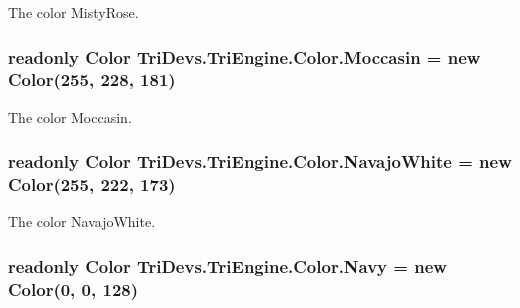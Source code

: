 The color Misty\-Rose. 

\hypertarget{struct_tri_devs_1_1_tri_engine_1_1_color_a39be3b920f7db0c555fc245e8a0dd127}{
\subsubsection[{Moccasin}]{\setlength{\rightskip}{0pt plus 5cm}readonly {\bf Color} Tri\-Devs.\-Tri\-Engine.\-Color.\-Moccasin = new {\bf Color}(255, 228, 181)\hspace{0.3cm}{\ttfamily [static]}}}\label{struct_tri_devs_1_1_tri_engine_1_1_color_a39be3b920f7db0c555fc245e8a0dd127}


The color Moccasin. 

\hypertarget{struct_tri_devs_1_1_tri_engine_1_1_color_a952ea6f9d5a1177039d21902cd13ba0a}{
\subsubsection[{Navajo\-White}]{\setlength{\rightskip}{0pt plus 5cm}readonly {\bf Color} Tri\-Devs.\-Tri\-Engine.\-Color.\-Navajo\-White = new {\bf Color}(255, 222, 173)\hspace{0.3cm}{\ttfamily [static]}}}\label{struct_tri_devs_1_1_tri_engine_1_1_color_a952ea6f9d5a1177039d21902cd13ba0a}


The color Navajo\-White. 

\hypertarget{struct_tri_devs_1_1_tri_engine_1_1_color_a32ffc00095e679b07fc1da8b59ff4f5e}{
\subsubsection[{Navy}]{\setlength{\rightskip}{0pt plus 5cm}readonly {\bf Color} Tri\-Devs.\-Tri\-Engine.\-Color.\-Navy = new {\bf Color}(0, 0, 128)\hspace{0.3cm}{\ttfamily [static]}}}\label{struct_tri_devs_1_1_tri_engine_1_1_color_a32ffc00095e679b07fc1da8b59ff4f5e}


